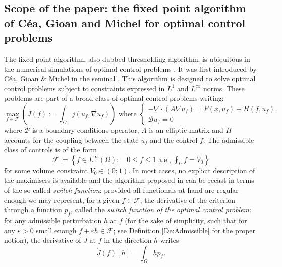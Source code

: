 \documentclass{article}
\renewcommand{\leq}{\leqslant}
\def\e{{\varepsilon}}
\def\O{{\Omega}}
\def\n{{\nabla}}
\numberwithin{equation}{section}
\begin{document}
\subsection{Scope of the paper: the fixed point algorithm of C\'ea,  Gioan and Michel for optimal control problems}
The fixed-point algorithm, also dubbed thresholding algorithm, is ubiquitous in the numerical simulations of optimal control problems \cite{BintzLenhart,Quantum,Chanillo2000,HintermullerKaoLaurain,KaoLouYanagida,KaoMohammadi,KaoMohammadiOsting,LLNP,Pironneau,KaoMohammadi2}. It was first introduced by C\'ea, Gioan \& Michel in the seminal \cite{Cea}. This algorithm is designed to solve optimal control problems subject to constraints expressed in $L^1$ and $L^\infty$ norms. These problems are part of a broad class of optimal control problems writing:
\begin{equation}\label{Eq:Ex}\tag{$\bold P$}
\max_{f\in \mathcal F}\left(J(f):= \int_\O j(u_f,\n u_f)\right)\text{ where }\begin{cases}-\nabla \cdot (A\n u_f)=F(x,u_f)+H(f,u_f)\,, 
\\ \mathcal Bu_f=0\end{cases}\end{equation} where $\mathcal B$ is a boundary conditions operator, $A$ is an elliptic matrix and $H$ accounts for the coupling between the state $u_f$ and the control $f$. The admissible class of controls is of the form 
\[ \mathcal F:=\left\{f\in L^\infty(\O):\quad 0\leq f\leq 1\text{ a.e., }\fint_\O f=V_0\right\}\] for some volume constraint $V_0\in (0;1)$. In most cases, no explicit description of the maximisers is available and the algorithm proposed in \cite{Cea} can be recast in terms of the so-called \emph{switch function}: provided all functionals at hand are regular enough we may represent, for a given $f\in \mathcal F$, the derivative of the criterion through a function $p_f$, called the \emph{switch function of the optimal control problem}: for any admissible perturbation $h$ at $f$ (for the sake of simplicity, such that for any $\e>0$ small enough $f+\e h\in \mathcal F$;  see Definition \ref{De:Admissible} for the proper notion), the derivative of $J$ at $f$ in the direction $h$ writes
\[ \dot J(f)[h]=\int_\O h p_f.\] 
\end{document}
